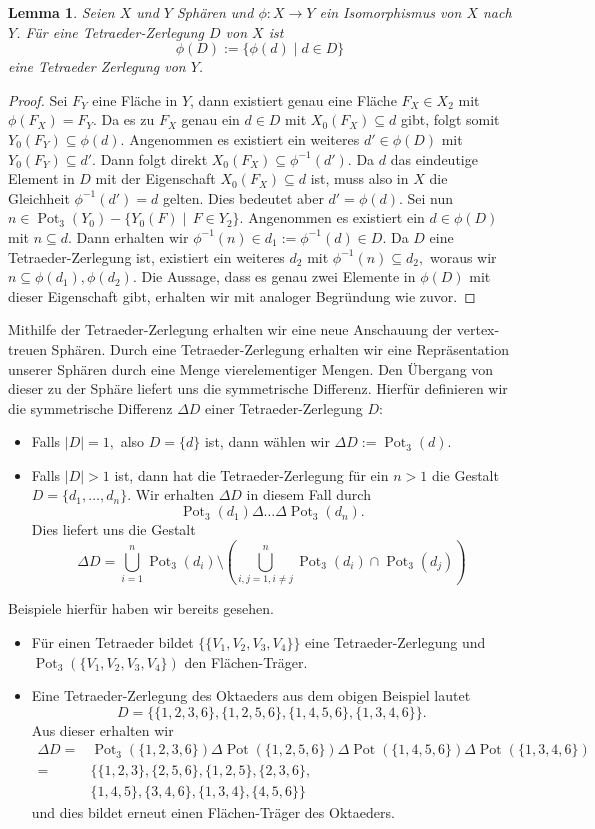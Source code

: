 \documentclass[12pt,titlepage,twoside,cleardoublepage]{article}
\theoremstyle{nummermitklammern}
\newtheorem{lemma}[temp]{Lemma}
\newtheorem{lemma}[zahl]{Lemma}
\numberwithin{equation}{section}
\DeclareMathOperator{\Pot}{Pot}
\begin{document}
\begin{lemma}
Seien $X$ und $Y$ Sphären und $\phi:X\to Y$ ein Isomorphismus von $X$ nach $Y$. Für eine Tetraeder-Zerlegung $D$ von $X$ ist \[
\phi(D):=\{\phi(d)\mid d\in D\}
\] eine Tetraeder Zerlegung von $Y$.
\end{lemma}
\begin{proof}
Sei $F_Y$ eine Fläche in $Y$, dann existiert genau eine Fläche $F_X\in X_2$ mit $\phi(F_X)=F_Y.$
 Da es zu $F_X$ genau ein $d\in D$ mit $X_0(F_X) \subseteq d$ gibt, folgt somit $Y_0(F_Y)\subseteq \phi(d).$
  Angenommen es existiert ein weiteres $d'\in \phi(D)$ mit $Y_0(F_Y)\subseteq d'$. Dann folgt direkt $X_0(F_X)\subseteq\phi^{-1}(d').$
   Da $d$ das eindeutige Element in $D$ mit der Eigenschaft $X_0(F_X)\subseteq d$ ist, muss also in $X$ die Gleichheit $\phi^{-1}(d')=d$ gelten. Dies bedeutet aber $d'=\phi(d).$ Sei nun $n\in \Pot_3(Y_0)-\{Y_0(F)\mid \,F \in Y_2\}.$ Angenommen es existiert ein $d\in \phi(D)$ mit $n\subseteq d.$ Dann erhalten wir $\phi^{-1}(n)\in d_1:=\phi^{-1}(d)\in D.$ Da  $D$ eine Tetraeder-Zerlegung ist, existiert ein weiteres $d_2$ mit $\phi^{-1}(n)\subseteq d_2,$ woraus wir $n\subseteq \phi(d_1),\phi(d_2).$ Die Aussage, dass es genau zwei Elemente in $\phi(D)$ mit dieser Eigenschaft gibt, erhalten wir mit analoger Begründung wie zuvor.  
\end{proof}
Mithilfe der Tetraeder-Zerlegung erhalten wir eine neue Anschauung der vertex-treuen Sphären. Durch eine Tetraeder-Zerlegung erhalten wir eine Repräsentation unserer Sphären durch eine Menge vierelementiger Mengen. Den Übergang von dieser zu der Sphäre liefert uns die symmetrische Differenz. Hierfür definieren wir die symmetrische Differenz $\Delta D$ einer Tetraeder-Zerlegung $D:$
\begin{itemize}
\item Falls $\vert D\vert =1,$ also $D=\{d\}$ ist, dann wählen wir $\Delta D:=\Pot_3(d).$
\item Falls $\vert D\vert >1$ ist, dann hat die Tetraeder-Zerlegung für ein $n>1$ die Gestalt $D=\{d_1,\ldots,d_n\}.$
Wir  erhalten $\Delta D$ in diesem Fall durch
\[
\Pot_3(d_1)\Delta \ldots \Delta \Pot_3(d_n).
\]
Dies liefert uns die Gestalt 
\[
\Delta D=\bigcup^n_{i=1} \Pot_3(d_i)\setminus  (\bigcup^n_{i,j=1,i\neq j}\Pot_3(d_i)\cap \Pot_3(d_j))
\]
\end{itemize} 
Beispiele hierfür haben wir bereits gesehen.
\begin{itemize}
\item Für einen Tetraeder bildet $\{\{V_1,V_2,V_3,V_4\}\}$ eine Tetraeder-Zerlegung und $\Pot_3(\{V_1,V_2,V_3,V_4\})$ den Flächen-Träger.
\item Eine Tetraeder-Zerlegung des Oktaeders aus dem obigen Beispiel lautet
 \[
D=\{\{1,2,3,6\},\{1,2,5,6\},\{1,4,5,6\},\{1,3,4,6\}\}. 
 \]
 Aus dieser erhalten wir 
 \begin{align*}
\Delta D=&\Pot_3(\{1,2,3,6\})\Delta\Pot(\{1,2,5,6\})\Delta\Pot(\{1,4,5,6\})\Delta\Pot(\{1,3,4,6\})\\
=&\{\{1,2,3\},\{2,5,6\},\{1,2,5\},\{2,3,6\},\\
&\{1,4,5\},\{3,4,6\},\{1,3,4\},\{4,5,6\}\}
\end{align*}
und dies bildet erneut einen Flächen-Träger des Oktaeders.
\end{itemize} 
\end{document}
